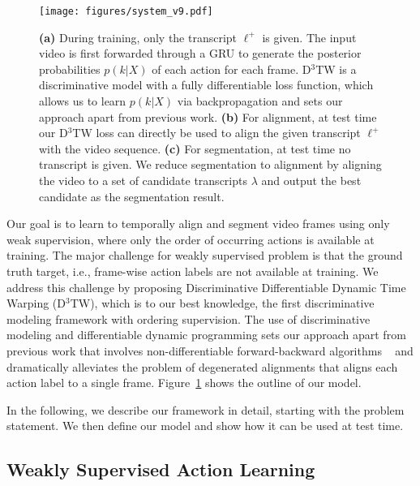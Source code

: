 \documentclass[10pt,twocolumn,letterpaper]{article}
\newcommand{\dttw}{D${}^3$TW\xspace}
\begin{document}
\begin{figure}[tb]
\centering
\texttt{[image: figures/system\_v9.pdf]}
   \vspace{-2mm}
   \caption{
      \textbf{(a)} During training, only the transcript $\ell^+$ is given. The input video is first forwarded through a GRU to generate the posterior probabilities $p(k|X)$ of each action for each frame. \dttw is a discriminative model with a fully differentiable loss function, which allows us to learn $p(k|X)$ via backpropagation and sets our approach apart from previous work. \textbf{(b)} For alignment, at test time our \dttw loss can directly be used to align the given transcript $\ell^+$ with the video sequence.  \textbf{(c)} For segmentation, at test time no transcript is given. We reduce segmentation to alignment by aligning the video to a set of candidate transcripts $\lambda$ and output the best candidate as the segmentation result. 
   }
   \vspace{-1mm}
\label{fig:system_v2}
\end{figure}



Our goal is to learn to temporally align and segment video frames using only weak supervision, where only the order of occurring actions is available at training.
The major challenge for weakly supervised problem is that the ground truth target, i.e., frame-wise action labels are not available at training. We address this challenge by proposing Discriminative  Differentiable  Dynamic Time Warping (\dttw), which is to our best knowledge, the first discriminative modeling framework with ordering supervision. The use of discriminative modeling and differentiable dynamic programming sets our approach apart from previous work that involves non-differentiable forward-backward algorithms ~\cite{graves2006connectionist, huang2016connectionist, richard2018neuralnetwork} and dramatically alleviates the problem of degenerated alignments that aligns each action label to a single frame. Figure~\ref{fig:system_v2} shows the outline of our model.

In the following, we describe our framework in detail, starting with the problem statement. We then define our model and show how it can be used at test time. 


\subsection{Weakly Supervised Action Learning}
\end{document}
